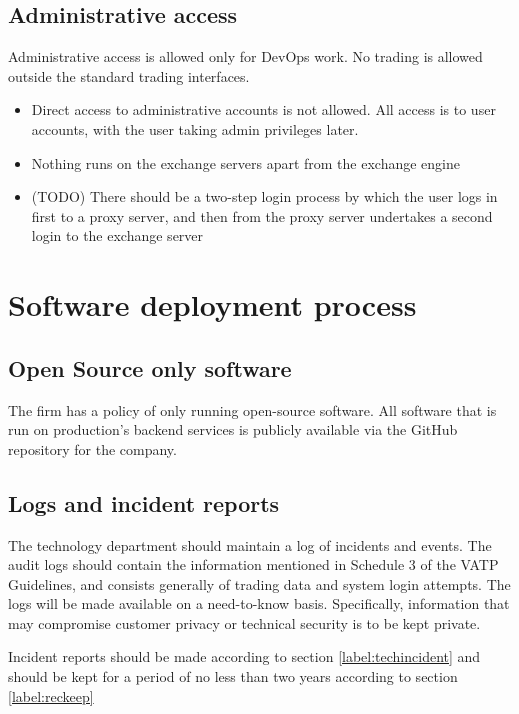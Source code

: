 \subsection{Administrative access}
Administrative access is allowed only for DevOps work.  No trading is
allowed outside the standard trading interfaces.

\begin{itemize}
\item Direct access to administrative accounts is not allowed.  All
  access is to user accounts, with the user taking admin privileges
  later.
\item Nothing runs on the exchange servers apart from the exchange engine
\item (TODO) There should be a two-step login process by which the
  user logs in first to a proxy server, and then from the proxy server
  undertakes a second login to the exchange server
\end{itemize}

\section{Software deployment process}
\subsection{Open Source only software}

The firm has a policy of only running open-source software.  All
software that is run on production's backend services is publicly
available via the GitHub repository for the company.
\subsection{Logs and incident reports}
The technology department should maintain a log of incidents and
events.  The audit logs should contain the information mentioned in
Schedule 3 of the VATP Guidelines, and consists generally of trading
data and system login attempts.  The logs will be made available on a
need-to-know basis.  Specifically, information that may compromise
customer privacy or technical security is to be kept private.

Incident reports should be made according to section
\ref{label:techincident} and should be kept for a period of no less
than two years according to section \ref{label:reckeep} 



